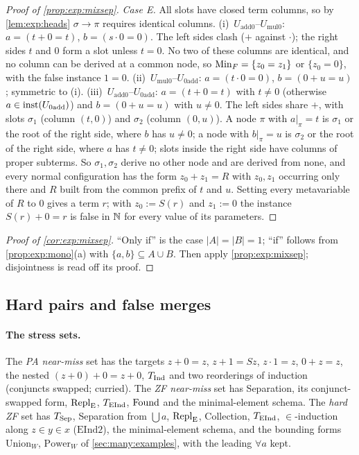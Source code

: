\begin{proof}[Proof of \cref{prop:exp:mixsep}]
\emph{Case E.} All slots have closed term columns, so by \cref{lem:exp:heads} $\sigma\to\pi$ requires identical columns.
(i)~$U_{\mathrm{add0}}$--$U_{\mathrm{mul0}}$: $a=(t+0=t)$, $b=(s\cdot0=0)$. The left sides clash ($+$ against $\cdot$); the right sides $t$ and $0$ form a slot unless $t=0$. No two of these columns are identical, and no column can be derived at a common node, so $\mathrm{Min}_F=\{z_0=z_1\}$ or $\{z_0=0\}$, with the false instance $1=0$.
(ii)~$U_{\mathrm{mul0}}$--$U_{\mathrm{0add}}$: $a=(t\cdot0=0)$, $b=(0+u=u)$; symmetric to (i).
(iii)~$U_{\mathrm{add0}}$--$U_{\mathrm{0add}}$: $a=(t+0=t)$ with $t\neq0$ (otherwise $a\in\mathrm{inst}(U_{\mathrm{0add}})$) and $b=(0+u=u)$ with $u\neq0$. The left sides share $+$, with slots $\sigma_1$ (column $(t,0)$) and $\sigma_2$ (column $(0,u)$). A node $\pi$ with $a|_\pi=t$ is $\sigma_1$ or the root of the right side, where $b$ has $u\neq0$; a node with $b|_\pi=u$ is $\sigma_2$ or the root of the right side, where $a$ has $t\neq0$; slots inside the right side have columns of proper subterms. So $\sigma_1,\sigma_2$ derive no other node and are derived from none, and every normal configuration has the form $z_0+z_1=R$ with $z_0,z_1$ occurring only there and $R$ built from the common prefix of $t$ and $u$. Setting every metavariable of $R$ to $0$ gives a term $r$; with $z_0:=S(r)$ and $z_1:=0$ the instance $S(r)+0=r$ is false in $\mathbb{N}$ for every value of its parameters.
\end{proof}

\begin{proof}[Proof of \cref{cor:exp:mixsep}]
``Only if'' is the case $|A|=|B|=1$; ``if'' follows from \cref{prop:exp:mono}(a) with $\{a,b\}\subseteq A\cup B$. Then apply \cref{prop:exp:mixsep}; disjointness is read off its proof.
\end{proof}

\subsection{Hard pairs and false merges}\label{app:exp:stress}

\paragraph{The stress sets.} The \emph{PA near-miss} set has the targets $z+0=z$, $z+1=Sz$, $z\cdot1=z$, $0+z=z$, the nested $(z+0)+0=z+0$, $T_{\mathrm{Ind}}$ and two reorderings of induction (conjuncts swapped; curried). The \emph{ZF near-miss} set has Separation, its conjunct-swapped form, $\mathrm{Repl}_{\mathrm{E}}$, $T_{\mathrm{EInd}}$, $\mathrm{Found}$ and the minimal-element schema. The \emph{hard ZF} set has $T_{\mathrm{Sep}}$, Separation from $\bigcup a$, $\mathrm{Repl}_{\mathrm{E}}$, Collection, $T_{\mathrm{EInd}}$, $\in$-induction along $z\in y\in x$ ($\mathrm{EInd2}$), the minimal-element schema, and the bounding forms $\mathrm{Union}_W$, $\mathrm{Power}_W$ of \cref{sec:many:examples}, with the leading $\forall a$ kept.

